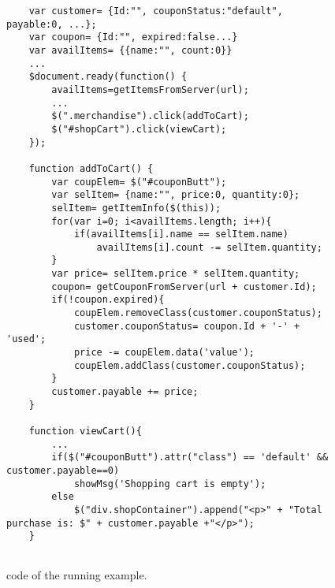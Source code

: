 \begin{figure}
\begin{lstlisting}
	var customer= {Id:"", couponStatus:"default", payable:0, ...};
	var coupon= {Id:"", expired:false...}
	var availItems= {{name:"", count:0}}
	...
	$document.ready(function() {
		availItems=getItemsFromServer(url);		
		...	
		$(".merchandise").click(addToCart);
		$("#shopCart").click(viewCart);
	});
	
	function addToCart() {
		var coupElem= $("#couponButt");
		var selItem= {name:"", price:0, quantity:0};
		selItem= getItemInfo($(this));
		for(var i=0; i<availItems.length; i++){
			if(availItems[i].name == selItem.name)
				availItems[i].count -= selItem.quantity;		
		}
		var price= selItem.price * selItem.quantity;
		coupon= getCouponFromServer(url + customer.Id);
		if(!coupon.expired){
			coupElem.removeClass(customer.couponStatus);
			customer.couponStatus= coupon.Id + '-' + 'used';
			price -= coupElem.data('value');	
			coupElem.addClass(customer.couponStatus);	
		} 	
		customer.payable += price;
	}

	function viewCart(){
		...
		if($("#couponButt").attr("class") == 'default' && customer.payable==0)
			showMsg('Shopping cart is empty');
		else
			$("div.shopContainer").append("<p>" + "Total purchase is: $" + customer.payable +"</p>");
	}


\end{lstlisting}
\vspace{-0.1in} 

\caption{\javascript code of the running example.}
\label{Fig:example}
\vspace{-0.2in} 

\end{figure}